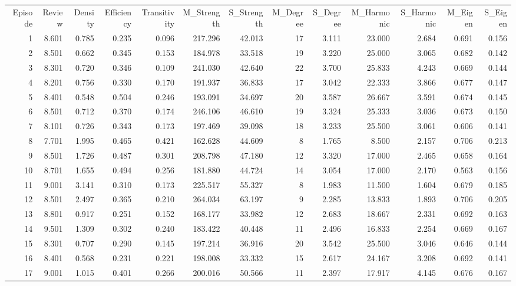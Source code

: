 \begin{tabular}{rrrrrrrrrrrrr}
Episode & Review & Density & Efficiency & Transitivity & M_Strength & S_Strength & M_Degree & S_Degree & M_Harmonic & S_Harmonic & M_Eigen & S_Eigen \\
1 & 8.601 & 0.785 & 0.235 & 0.096 & 217.296 & 42.013 & 17 & 3.111 & 23.000 & 2.684 & 0.691 & 0.156 \\
2 & 8.501 & 0.662 & 0.345 & 0.153 & 184.978 & 33.518 & 19 & 3.220 & 25.000 & 3.065 & 0.682 & 0.142 \\
3 & 8.301 & 0.720 & 0.346 & 0.109 & 241.030 & 42.640 & 22 & 3.700 & 25.833 & 4.243 & 0.669 & 0.144 \\
4 & 8.201 & 0.756 & 0.330 & 0.170 & 191.937 & 36.833 & 17 & 3.042 & 22.333 & 3.866 & 0.677 & 0.147 \\
5 & 8.401 & 0.548 & 0.504 & 0.246 & 193.091 & 34.697 & 20 & 3.587 & 26.667 & 3.591 & 0.674 & 0.145 \\
6 & 8.501 & 0.712 & 0.370 & 0.174 & 246.106 & 46.610 & 19 & 3.324 & 25.333 & 3.036 & 0.673 & 0.150 \\
7 & 8.101 & 0.726 & 0.343 & 0.173 & 197.469 & 39.098 & 18 & 3.233 & 25.500 & 3.061 & 0.606 & 0.141 \\
8 & 7.701 & 1.995 & 0.465 & 0.421 & 162.628 & 44.609 & 8 & 1.765 & 8.500 & 2.157 & 0.706 & 0.213 \\
9 & 8.501 & 1.726 & 0.487 & 0.301 & 208.798 & 47.180 & 12 & 3.320 & 17.000 & 2.465 & 0.658 & 0.164 \\
10 & 8.701 & 1.655 & 0.494 & 0.256 & 181.880 & 44.724 & 14 & 3.054 & 17.000 & 2.170 & 0.563 & 0.156 \\
11 & 9.001 & 3.141 & 0.310 & 0.173 & 225.517 & 55.327 & 8 & 1.983 & 11.500 & 1.604 & 0.679 & 0.185 \\
12 & 8.501 & 2.497 & 0.365 & 0.210 & 264.034 & 63.197 & 9 & 2.285 & 13.833 & 1.893 & 0.706 & 0.205 \\
13 & 8.801 & 0.917 & 0.251 & 0.152 & 168.177 & 33.982 & 12 & 2.683 & 18.667 & 2.331 & 0.692 & 0.163 \\
14 & 9.501 & 1.309 & 0.302 & 0.240 & 183.422 & 40.448 & 11 & 2.496 & 16.833 & 2.254 & 0.669 & 0.167 \\
15 & 8.301 & 0.707 & 0.290 & 0.145 & 197.214 & 36.916 & 20 & 3.542 & 25.500 & 3.046 & 0.646 & 0.144 \\
16 & 8.401 & 0.568 & 0.231 & 0.221 & 198.008 & 33.332 & 15 & 2.617 & 24.167 & 3.208 & 0.692 & 0.141 \\
17 & 9.001 & 1.015 & 0.401 & 0.266 & 200.016 & 50.566 & 11 & 2.397 & 17.917 & 4.145 & 0.676 & 0.167 \\

\end{tabular}

